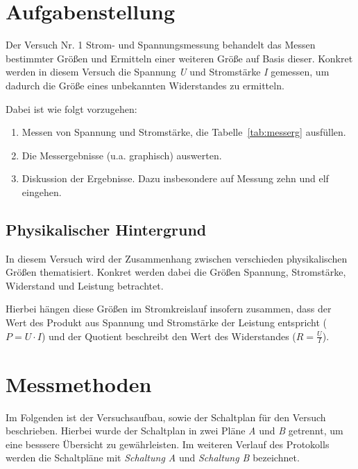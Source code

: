 \documentclass[10pt,a4paper]{article}
\newcommand{\vnr}{1}
\begin{document}
\newpage

\tableofcontents

\vspace{10pt}

\section{Aufgabenstellung}
\begin{flushleft}
Der Versuch Nr. \vnr \hspace{1pt} \glqq Strom- und Spannungsmessung\grqq\hspace{1pt} behandelt das Messen bestimmter Größen und Ermitteln einer weiteren Größe auf Basis dieser. Konkret werden in diesem Versuch die Spannung \textit{U} und Stromstärke \textit{I} gemessen, um dadurch die Größe eines unbekannten Widerstandes zu ermitteln.

Dabei ist wie folgt vorzugehen:
\begin{enumerate}[I]
\item Messen von Spannung und Stromstärke, die Tabelle~\ref{tab:messerg} ausfüllen.

\item Die Messergebnisse (u.a. graphisch) auswerten.

\item Diskussion der Ergebnisse. Dazu insbesondere auf Messung zehn und elf eingehen.
\end{enumerate}
\end{flushleft}

\subsection{Physikalischer Hintergrund}
\begin{flushleft}
In diesem Versuch wird der Zusammenhang zwischen verschieden physikalischen Größen thematisiert. Konkret werden dabei die Größen Spannung, Stromstärke, Widerstand und Leistung betrachtet.

Hierbei hängen diese Größen im Stromkreislauf insofern zusammen, dass der Wert des Produkt aus Spannung und Stromstärke der Leistung entspricht ($P = U \cdot I$) und der Quotient beschreibt den Wert des Widerstandes ($R = \frac{U}{I}$).
\end{flushleft}

\section{Messmethoden}
\begin{flushleft}
Im Folgenden ist der Versuchsaufbau, sowie der Schaltplan für den Versuch beschrieben. Hierbei wurde der Schaltplan in zwei Pläne \textit{A} und \textit{B} getrennt, um eine besssere Übersicht zu gewährleisten. Im weiteren Verlauf des Protokolls werden die Schaltpläne mit \textit{Schaltung A} und \textit{Schaltung B} bezeichnet.
\end{flushleft}
\end{document}

